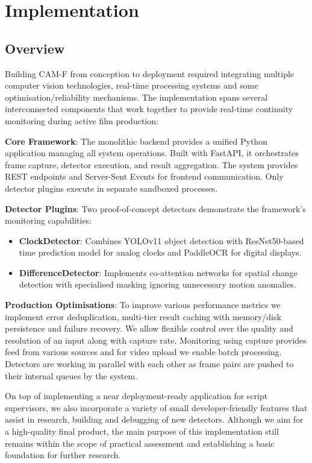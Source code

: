 \chapter{Implementation}

\section{Overview}
Building CAM-F from conception to deployment required integrating multiple computer vision technologies, real-time processing systems and some optimisation/reliability mechanisms. The implementation spans several interconnected components that work together to provide real-time continuity monitoring during active film production:

\textbf{Core Framework}: The monolithic backend provides a unified Python application managing all system operations. Built with FastAPI, it orchestrates frame capture, detector execution, and result aggregation. The system provides REST endpoints and Server-Sent Events for frontend communication. Only detector plugins execute in separate sandboxed processes.

\textbf{Detector Plugins}: Two proof-of-concept detectors demonstrate the framework's monitoring capabilities:
\begin{itemize}
\item \textbf{ClockDetector}: Combines YOLOv11 object detection with ResNet50-based time prediction model for analog clocks and PaddleOCR for digital displays.
\item \textbf{DifferenceDetector}: Implements co-attention networks for spatial change detection with specialised masking ignoring unnecessary motion anomalies.
\end{itemize}

\textbf{Production Optimisations}: To improve various performance metrics we implement error deduplication, multi-tier result caching with memory/disk persistence and failure recovery. We allow flexible control over the quality and resolution of an input along with capture rate. Monitoring using capture provides feed from various sources and for video upload we enable batch processing. Detectors are working in parallel with each other as frame pairs are pushed to their internal queues by the system.

On top of implementing a near deployment-ready application for script supervisors, we also incorporate a variety of small developer-friendly features that assist in research, building and debugging of new detectors. Although we aim for a high-quality final product, the main purpose of this implementation still remains within the scope of practical assessment and establishing a basic foundation for further research.

